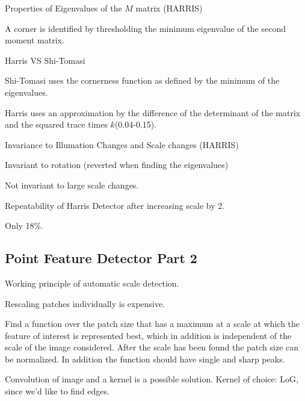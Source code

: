 \documentclass[10pt,a4paper]{scrartcl}
\begin{document}
\begin{multicols*}{2}
\begin{QandA}{Properties of Eigenvalues of the $M$ matrix (HARRIS)}
\item A corner is identified by thresholding the minimum eigenvalue of the second moment matrix. 
\end{QandA}

\begin{QandA}{Harris VS Shi-Tomasi}
\item Shi-Tomasi uses the cornerness function as defined by the minimum of the eigenvalues. 

\item Harris uses an approximation by the difference of the determinant of the matrix and the squared trace times $k$(0.04-0.15).

\end{QandA}

\begin{QandA}{Invariance to Illumation Changes and Scale changes (HARRIS)}
\item Invariant to rotation (reverted when finding the eigenvalues)
\item Not invariant to large scale changes.
\end{QandA}

\begin{QandA}{Repeatability of Harris Detector after increasing scale by 2.}
\item Only 18\%.
\end{QandA}

\subsection*{Point Feature Detector Part 2}

\begin{QandA}
{Working principle of automatic scale detection.}
\item Rescaling patches individually is expensive.
\item Find a function over the patch size that has a maximum at a scale at which the feature of interest is represented best, which in addition is independent of the scale of the image considered. After the scale has been found the patch size can be normalized. In addition the function should have single and sharp peaks.
\item Convolution of image and a kernel is a possible solution. Kernel of choice: LoG, since we'd like to find edges.
\end{QandA}


\end{multicols*}
\end{document}
